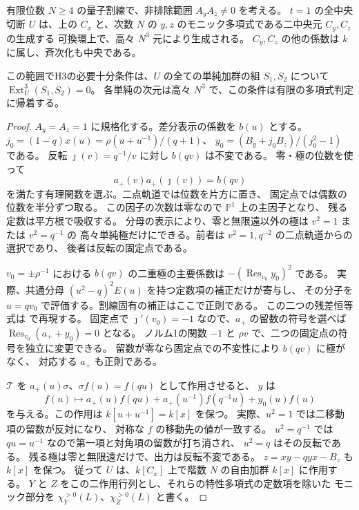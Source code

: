 \begin{theorem}\label{thm:cubic-CY-three-alpha-finite-secant-full}
有限位数 $N\ge4$ の量子割線で、非排除範囲 $A_yA_z\ne0$ を考える。
$t=1$ の全中央切断 $U$ は、上の $C_x$ と、次数 $N$ の
$y,z$ のモニック多項式である二中央元 $C_y,C_z$ の生成する
可換環上で、高々 $N^3$ 元により生成される。
$C_y,C_z$ の他の係数は $k$ に属し、斉次化も中央である。

この範囲でH3の必要十分条件は、$U$ の全ての単純加群の組
$S_1,S_2$ について $\operatorname{Ext}^3_U(S_1,S_2)=0$。
各単純の次元は高々 $N^3$ で、この条件は有限の多項式判定に帰着する。
\end{theorem}
\begin{proof}
$A_y=A_z=1$ に規格化する。差分表示の係数を $b(u)$ とする。
$j_0=(1-q)x(u)=\rho(u+u^{-1})/(q+1)$、
$y_0=(B_y+j_0B_z)/(j_0^2-1)$ である。
反転 $\jmath(v)=q^{-1}/v$ に対し $b(qv)$ は不変である。
零・極の位数を使って
\[
 a_+(v)a_+(\jmath(v))=b(qv)
\]
を満たす有理関数を選ぶ。二点軌道では位数を片方に置き、
固定点では偶数の位数を半分ずつ取る。
この因子の次数は零なので $\mathbb P^1$ 上の主因子となり、
残る定数は平方根で吸収する。
分母の表示により、零と無限遠以外の極は $v^2=1$ または $v^2=q^{-1}$ の
高々単純極だけにできる。前者は $v^2=1,q^{-2}$ の二点軌道からの選択であり、
後者は反転の固定点である。

$v_0=\pm\rho^{-1}$ における $b(qv)$ の二重極の主要係数は
$-(\operatorname{Res}_{v_0}y_0)^2$ である。
実際、共通分母 $(u^2-q)^2E(u)$ を持つ定数項の補正だけが寄与し、
その分子を $u=qv_0$ で評価する。割線固有の補正はここで正則である。
この二つの残差恒等式は
 で再現する。
固定点で $\jmath'(v_0)=-1$ なので、$a_+$ の留数の符号を選べば
$\operatorname{Res}_{v_0}(a_++y_0)=0$ となる。
ノルム1の関数 $-1$ と $\rho v$ で、二つの固定点の符号を独立に変更できる。
留数が零なら固定点での不変性により $b(qv)$ に極がなく、
対応する $a_+$ も正則である。

$\mathcal T$ を $a_+(u)\sigma$、$\sigma f(u)=f(qu)$ として作用させると、
$y$ は
\[
 f(u)\longmapsto a_+(u)f(qu)+a_+(u^{-1})f(q^{-1}u)+y_0(u)f(u)
\]
を与える。この作用は $k[u+u^{-1}]=k[x]$ を保つ。
実際、$u^2=1$ では二移動項の留数が反対になり、
対称な $f$ の移動先の値が一致する。
$u^2=q^{-1}$ では $qu=u^{-1}$ なので第一項と対角項の留数が打ち消され、
$u^2=q$ はその反転である。
残る極は零と無限遠だけで、出力は反転不変である。
$z=xy-qyx-B_z$ も $k[x]$ を保つ。
従って $U$ は、$k[C_x]$ 上で階数 $N$ の自由加群 $k[x]$ に作用する。
$Y$ と $Z$ をこの二作用行列とし、それらの特性多項式の定数項を除いた
モニック部分を $\chi_Y^{>0}(L)$、$\chi_Z^{>0}(L)$ と書く。


\end{proof}
